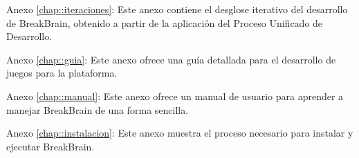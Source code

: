 \begin{definitionlist}
\item [Anexo \ref{chap::iteraciones}: \nameref{chap::iteraciones}] Este anexo contiene el desglose iterativo del desarrollo de BreakBrain, obtenido a partir de la aplicación del Proceso Unificado de Desarrollo.

\item [Anexo \ref{chap::guia}: \nameref{chap::guia}] Este anexo ofrece una guía detallada para el desarrollo de juegos para la plataforma.

\item [Anexo \ref{chap::manual}: \nameref{chap::manual}] Este anexo ofrece un manual de usuario para aprender a manejar BreakBrain de una forma sencilla.

\item [Anexo \ref{chap::instalacion}: \nameref{chap::instalacion}] Este anexo muestra el proceso necesario para instalar y ejecutar BreakBrain.
\end{definitionlist}

